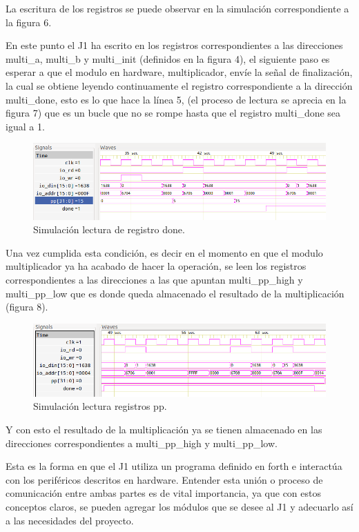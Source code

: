\documentclass[a4paper,10pt]{article}
\begin{document}
La escritura de los registros se puede observar en la simulación correspondiente a la figura 6.

En este punto el J1 ha escrito en los registros correspondientes a las direcciones multi\_a, multi\_b y multi\_init (definidos en la figura 4), el siguiente paso es esperar a que el modulo en hardware, multiplicador, envíe la señal de finalización, la cual se obtiene leyendo continuamente el registro correspondiente a la dirección multi\_done, esto es lo que hace la línea 5, (el proceso de lectura se aprecia en la figura 7) que es un bucle que no se rompe hasta que el registro multi\_done sea igual a 1.

\begin{figure}[H]	%
  \centering
    \includegraphics[scale=0.7]{sim_read1_mult.png}
      \caption{Simulación lectura de registro done.}
	\label{fig6}
\end{figure}

Una vez cumplida esta condición, es decir en el momento en que el modulo multiplicador  ya ha acabado de hacer la operación, se leen los registros correspondientes a las direcciones a las que apuntan multi\_pp\_high y multi\_pp\_low que es donde queda almacenado el resultado de la multiplicación (figura 8).

\begin{figure}[H]	%
  \centering
    \includegraphics[scale=0.7]{sim_read2_mult.png}
      \caption{Simulación lectura registros pp.}
	\label{fig7}
\end{figure}

Y con esto el resultado de la multiplicación ya se tienen almacenado en las direcciones correspondientes a multi\_pp\_high y multi\_pp\_low.

Esta es la forma en que el J1 utiliza un programa definido en forth e interactúa con los periféricos descritos en hardware. Entender esta unión o proceso de comunicación entre ambas partes es de vital importancia, ya que con estos conceptos claros, se pueden agregar los módulos que se desee al J1 y adecuarlo así a las necesidades del proyecto.
\end{document}
